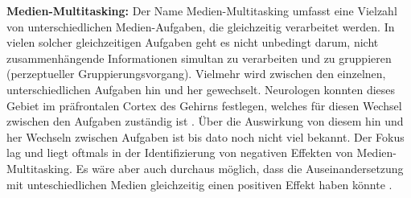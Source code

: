 \par
\textbf{Medien-Multitasking:} Der Name Medien-Multitasking umfasst eine Vielzahl von unterschiedlichen Medien-Aufgaben, die gleichzeitig verarbeitet werden. In vielen solcher gleichzeitigen Aufgaben geht es nicht unbedingt darum, nicht zusammenhängende Informationen simultan zu verarbeiten und zu gruppieren (perzeptueller Gruppierungsvorgang). Vielmehr wird zwischen den einzelnen, unterschiedlichen Aufgaben hin und her gewechselt. Neurologen konnten dieses Gebiet im präfrontalen Cortex des Gehirns festlegen, welches für diesen Wechsel zwischen den Aufgaben zuständig ist \cite{Wallis2006, Wood2003}. Über die Auswirkung von diesem hin und her Wechseln zwischen Aufgaben ist bis dato noch nicht viel bekannt. Der Fokus lag und liegt oftmals in der Identifizierung von negativen Effekten von Medien-Multitasking. Es wäre aber auch durchaus möglich, dass die Auseinandersetzung mit unteschiedlichen Medien gleichzeitig einen positiven Effekt haben könnte \cite{Foehr2006}.   

